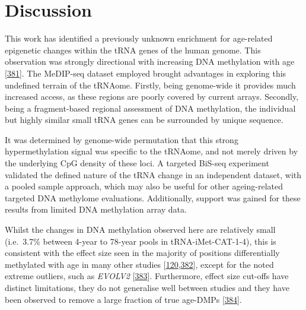 \documentclass[
]{book}
\begin{document}
\newpage

\hypertarget{tRNA-Discussion}{%
\section{Discussion}\label{tRNA-Discussion}}

This work has identified a previously unknown enrichment for age-related epigenetic changes within the tRNA genes of the human genome.
This observation was strongly directional with increasing DNA methylation with age {[}\protect\hyperlink{ref-Ehrlich2019}{381}{]}.
The MeDIP-seq dataset employed brought advantages in exploring this undefined terrain of the tRNAome.
Firstly, being genome-wide it provides much increased access, as these regions are poorly covered by current arrays.
Secondly, being a fragment-based regional assessment of DNA methylation, the individual but highly similar small tRNA genes can be surrounded by unique sequence.

It was determined by genome-wide permutation that this strong hypermethylation signal was specific to the tRNAome, and not merely driven by the underlying CpG density of these loci.
A targeted BiS-seq experiment validated the defined nature of the tRNA change in an independent dataset, with a pooled sample approach, which may also be useful for other ageing-related targeted DNA methylome evaluations.
Additionally, support was gained for these results from limited DNA methylation array data.

Whilst the changes in DNA methylation observed here are relatively small (i.e.~3.7\% between 4-year to 78-year pools in tRNA-iMet-CAT-1-4), this is consistent with the effect size seen in the majority of positions differentially methylated with age in many other studies {[}\protect\hyperlink{ref-Slieker2016}{120},\protect\hyperlink{ref-Xu2014b}{382}{]}, except for the noted extreme outliers, such as \emph{EVOLV2} {[}\protect\hyperlink{ref-Slieker2018}{383}{]}.
Furthermore, effect size cut-offs have distinct limitations, they do not generalise well between studies and they have been observed to remove a large fraction of true age-DMPs {[}\protect\hyperlink{ref-Zhu2018}{384}{]}.
\end{document}
